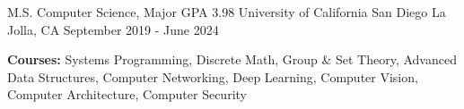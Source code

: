 
\begin{cventries}
  \cventry
    {M.S. Computer Science, Major GPA 3.98}
    {University of California San Diego}
    {La Jolla, CA}
    {September 2019 - June 2024}
    {
      \begin{cvitems}
        \item {\textbf{Courses:} Systems Programming, Discrete Math, Group \& Set Theory, Advanced Data Structures, Computer Networking, Deep Learning, Computer Vision, Computer Architecture, Computer Security}
      \end{cvitems}
    }
\end{cventries}

